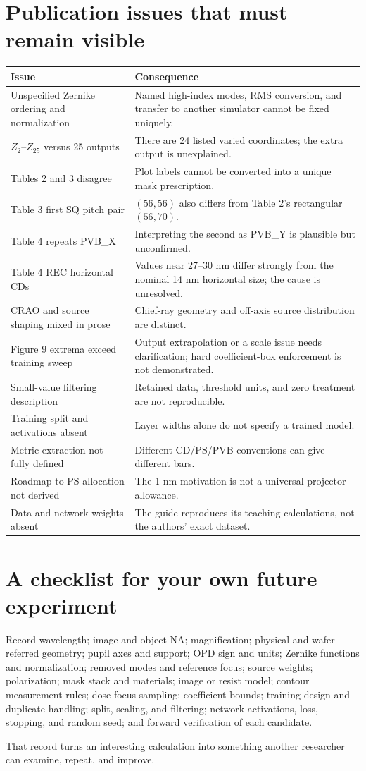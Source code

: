\section{Publication issues that must remain visible}
\begin{longtable}{@{}L{.31\textwidth}L{.63\textwidth}@{}}
\toprule Issue & Consequence\\ \midrule\endhead
Unspecified Zernike ordering and normalization
&Named high-index modes, RMS conversion, and transfer to another
simulator cannot be fixed uniquely.\\
$Z_2$--$Z_{25}$ versus 25 outputs
&There are 24 listed varied coordinates; the extra output is unexplained.\\
Tables 2 and 3 disagree
&Plot labels cannot be converted into a unique mask prescription.\\
Table 3 first SQ pitch pair
&$(56,56)$ also differs from Table 2's rectangular $(56,70)$.\\
Table 4 repeats PVB\_X
&Interpreting the second as PVB\_Y is plausible but unconfirmed.\\
Table 4 REC horizontal CDs
&Values near 27--30 nm differ strongly from the nominal 14 nm
horizontal size; the cause is unresolved.\\
CRAO and source shaping mixed in prose
&Chief-ray geometry and off-axis source distribution are distinct.\\
Figure 9 extrema exceed training sweep
&Output extrapolation or a scale issue needs clarification;
hard coefficient-box enforcement is not demonstrated.\\
Small-value filtering description
&Retained data, threshold units, and zero treatment are not reproducible.\\
Training split and activations absent
&Layer widths alone do not specify a trained model.\\
Metric extraction not fully defined
&Different CD/PS/PVB conventions can give different bars.\\
Roadmap-to-PS allocation not derived
&The 1 nm motivation is not a universal projector allowance.\\
Data and network weights absent
&The guide reproduces its teaching calculations, not the authors'
exact dataset.\\
\bottomrule
\end{longtable}

\section{A checklist for your own future experiment}
Record wavelength; image and object NA; magnification; physical and
wafer-referred geometry; pupil axes and support; OPD sign and units;
Zernike functions and normalization; removed modes and reference focus;
source weights; polarization; mask stack and materials; image or resist
model; contour measurement rules; dose-focus sampling; coefficient bounds;
training design and duplicate handling; split, scaling, and filtering;
network activations, loss, stopping, and random seed; and forward
verification of each candidate.

That record turns an interesting calculation into something another
researcher can examine, repeat, and improve.
